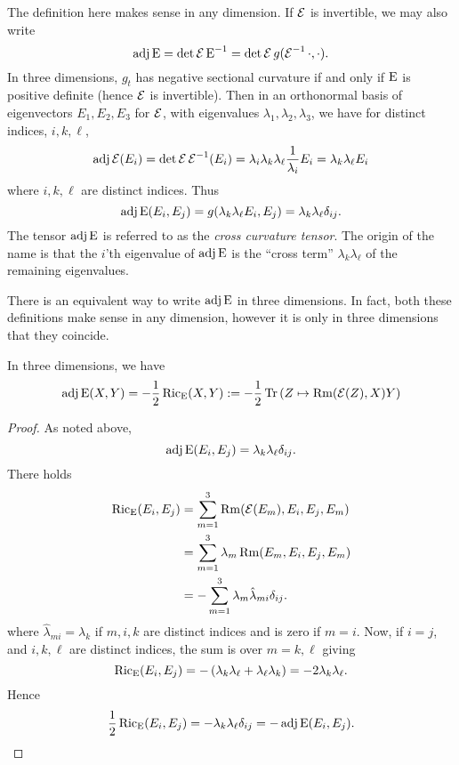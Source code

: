 \documentclass[a4paper,12pt]{amsart}
\begin{document}
The definition here makes sense in any dimension. If \(\operatorname{\mathcal{E}}\) is invertible, we may also write
\[
\operatorname{adj}\operatorname{E} = \det \operatorname{\mathcal{E}} \operatorname{E}^{-1} = \det\operatorname{\mathcal{E}} g(\operatorname{\mathcal{E}}^{-1} \cdot, \cdot).
\]
In three dimensions, \(g_t\) has negative sectional curvature if and only if \(\operatorname{E}\) is positive definite (hence \(\operatorname{\mathcal{E}}\) is invertible). Then in an orthonormal basis of eigenvectors \(E_1, E_2, E_3\) for \(\operatorname{\mathcal{E}}\), with eigenvalues \(\lambda_1, \lambda_2, \lambda_3\), we have for distinct indices, \(i, k, \ell\),
\[
\operatorname{adj}\operatorname{\mathcal{E}} (E_i) = \det\operatorname{\mathcal{E}} \operatorname{\mathcal{E}}^{-1}(E_i) = \lambda_i \lambda_k \lambda_{\ell} \frac{1}{\lambda_i} E_i = \lambda_k \lambda_{\ell} E_i
\]
where \(i,k,\ell\) are distinct indices. Thus
\begin{equation}
\label{eq:cross_curvature}
\operatorname{adj}\operatorname{E}(E_i, E_j) = g(\lambda_k \lambda_{\ell} E_i, E_j) = \lambda_k \lambda_{\ell} \delta_{ij}.
\end{equation}
The tensor \(\operatorname{adj}\operatorname{E}\) is referred to as the \emph{cross curvature tensor}. The origin of the name is that the \(i\)'th eigenvalue of \(\operatorname{adj}\operatorname{E}\) is the ``cross term'' \(\lambda_k \lambda_{\ell}\) of the remaining eigenvalues.

There is an equivalent way to write \(\operatorname{adj}\operatorname{E}\) in three dimensions. In fact, both these definitions make sense in any dimension, however it is only in three dimensions that they coincide.
\begin{lemma}
\label{lem:xcf_equiv}

In three dimensions, we have
\[
\operatorname{adj}\operatorname{E}(X, Y) = -\frac{1}{2} \operatorname{Ric}_{\operatorname{E}} (X, Y) :=- \frac{1}{2} \operatorname{Tr} \left(Z \mapsto \operatorname{Rm}(\operatorname{\mathcal{E}}(Z), X) Y\right)
\]
\end{lemma}
\begin{proof}
As noted above,
\[
\operatorname{adj}\operatorname{E}(E_i, E_j) = \lambda_k \lambda_{\ell} \delta_{ij}.
\]
There holds
\[
\begin{split}
\operatorname{Ric}_{\operatorname{E}}(E_i, E_j) &= \sum_{m=1}^3 \operatorname{Rm}(\operatorname{\mathcal{E}}(E_m), E_i, E_j, E_m) \\
&= \sum_{m=1}^3 \lambda_m \operatorname{Rm}(E_m, E_i, E_j, E_m) \\
&= -\sum_{m=1}^3 \lambda_m \hat{\lambda}_{mi}\delta_{ij}.
\end{split}
\]
where \(\hat{\lambda}_{mi} = \lambda_k\) if \(m,i,k\) are distinct indices and is zero if \(m=i\). Now, if \(i = j\), and \(i, k, \ell\) are distinct indices, the sum is over \(m=k, \ell\) giving
\[
\operatorname{Ric}_{\operatorname{E}}(E_i, E_j) = -\left(\lambda_k \lambda_{\ell} + \lambda_{\ell} \lambda_k\right) = -2\lambda_k \lambda_{\ell}.
\]
Hence
\[
\frac{1}{2} \operatorname{Ric}_{\operatorname{E}}(E_i, E_j) =  -\lambda_k \lambda_{\ell} \delta_{ij} = -\operatorname{adj}\operatorname{E}(E_i, E_j).
\]
\end{proof}
\end{document}
